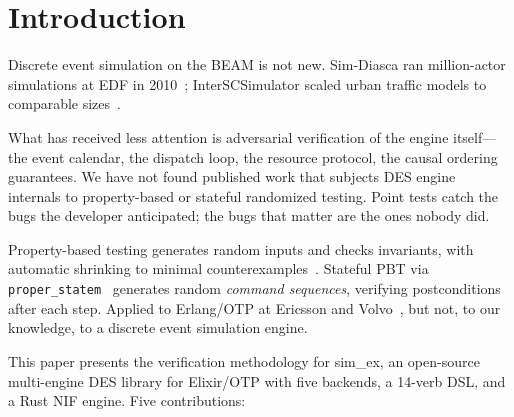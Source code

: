 \documentclass[sigplan,review,anonymous=false]{acmart}
\begin{document}

\maketitle

\section{Introduction}

Discrete event simulation on the BEAM is not new. Sim-Diasca ran
million-actor simulations at EDF in 2010~\cite{boudeville2010};
InterSCSimulator scaled urban traffic models to comparable
sizes~\cite{santana2017}.

What has received less attention is adversarial verification of the
engine itself---the event calendar, the dispatch loop, the resource
protocol, the causal ordering guarantees. We have not found published
work that subjects DES engine internals to property-based or stateful
randomized testing. Point tests catch the bugs the developer
anticipated; the bugs that matter are the ones nobody did.

Property-based testing generates random inputs and checks invariants,
with automatic shrinking to minimal counterexamples~\cite{claessen2000}.
Stateful PBT via \texttt{proper\_statem}~\cite{papadakis2011} generates
random \emph{command sequences}, verifying postconditions after each
step. Applied to Erlang/OTP at Ericsson and Volvo~\cite{arts2006,
hughes2007,hughes2016}, but not, to our knowledge, to a discrete event
simulation engine.

This paper presents the verification methodology for sim\_ex, an
open-source multi-engine DES library for Elixir/OTP with five backends,
a 14-verb DSL, and a Rust NIF engine. Five contributions:
\end{document}
